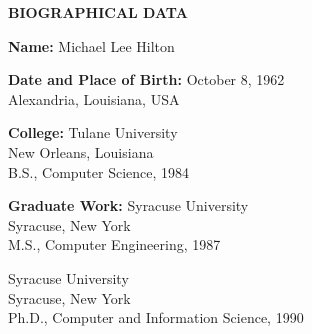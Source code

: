 \clearpage
\thispagestyle{plain}
\begin{center}
\textbf{BIOGRAPHICAL DATA}
\end{center}

\vspace{1.5in}

\noindent\textbf{Name:} Michael Lee Hilton

\vspace{1.5em}

\noindent\textbf{Date and Place of Birth:} October 8, 1962\\
\hspace*{1.95in}Alexandria, Louisiana, USA

\vspace{1.5em}

\noindent\textbf{College:} Tulane University\\
\hspace*{0.70in}New Orleans, Louisiana\\
\hspace*{0.70in}B.S., Computer Science, 1984

\vspace{1.5em}

\noindent\textbf{Graduate Work:} Syracuse University\\
\hspace*{1.30in}Syracuse, New York\\
\hspace*{1.30in}M.S., Computer Engineering, 1987

\vspace{1.5em}

\hspace*{1.30in}Syracuse University\\
\hspace*{1.30in}Syracuse, New York\\
\hspace*{1.30in}Ph.D., Computer and Information Science, 1990
